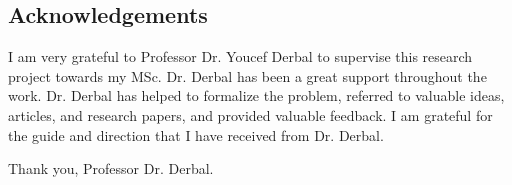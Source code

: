 \begin{center}\section*{Acknowledgements}\end{center}

\noindent I am very grateful to Professor Dr. Youcef Derbal to supervise this research project towards my MSc. Dr. Derbal has been a great support throughout the work. Dr. Derbal has helped to formalize the problem, referred to valuable ideas, articles, and research papers, and provided valuable feedback. I am grateful for the guide and direction that I have received from Dr. Derbal.

\medskip
\noindent Thank you, Professor Dr. Derbal.
